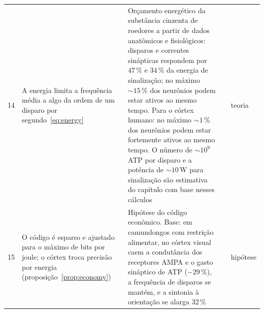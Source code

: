 {\begin{longtable}{>{\raggedright}p{0.5cm}>{\raggedright}p{4.0cm}>{\raggedright}p{5.6cm}>{\raggedright}p{2.3cm}>{\raggedright\arraybackslash}p{1.7cm}}
14 & A energia limita a frequência média a algo da ordem de um disparo por segundo~\eqref{eq:energy} & Orçamento energético da substância cinzenta de roedores a partir de dados anatômicos e fisiológicos: disparos e correntes sinápticas respondem por $47\,\%$ e $34\,\%$ da energia de sinalização; no máximo $\sim15\,\%$ dos neurônios podem estar ativos ao mesmo tempo. Para o córtex humano: no máximo $\sim1\,\%$ dos neurônios podem estar fortemente ativos ao mesmo tempo. O número de $\sim10^9$ ATP por disparo e a potência de $\sim10$\,W para sinalização são estimativa do capítulo com base nesses cálculos & \cite{Attwell2001,Lennie2003} & teoria \\
15 & O código é esparso e ajustado para o máximo de bits por joule; o córtex troca precisão por energia (proposição~\ref{prop:economy}) & Hipótese do código econômico. Base: em camundongos com restrição alimentar, no córtex visual caem a condutância dos receptores AMPA e o gasto sináptico de ATP ($-29\,\%$), a frequência de disparos se mantém, e a sintonia à orientação se alarga $32\,\%$ & \cite{Barlow1961,Padamsey2022} & hipótese \\
\bottomrule
\end{longtable}}
